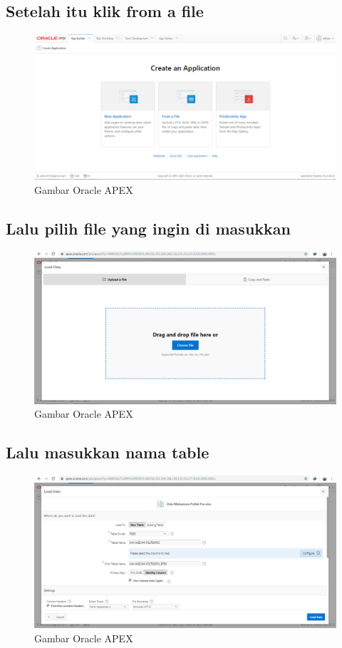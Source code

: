 \documentclass[12pt, times new roman, a4paper]{article}
\begin{document}
\subsection{Setelah itu klik from a file}
\begin{figure}[h]
	\centering
		\includegraphics[scale=0.3]{gambar/3}
	\caption{Gambar Oracle APEX}
\end{figure}

\subsection{Lalu pilih file yang ingin di masukkan}
\begin{figure}[h]
	\centering
		\includegraphics[scale=0.3]{gambar/4}
	\caption{Gambar Oracle APEX}
\end{figure}

\subsection{Lalu masukkan nama table}
\begin{figure}[h]
	\centering
		\includegraphics[scale=0.2]{gambar/5}
	\caption{Gambar Oracle APEX}
\end{figure}
\end{document}
